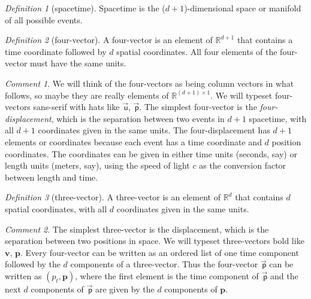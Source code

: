 \documentclass[10pt]{article}
\newcounter{par}
\theoremstyle{remark}
\newtheorem{definition}{Definition}
\theoremstyle{remark}
\newtheorem*{remark}{Comment}
\newcommand\upvec[1]{\!\vec{\,\mathrm{#1}}}
\newcommand{\tv}[1]{{\mathbf{#1}}} %
\newcommand{\fv}[1]{\upvec{\mathsf{#1}}} %
\begin{document}
\begin{definition}[spacetime]
    Spacetime is the ($d+1$)-dimensional space or manifold of all possible events.
\end{definition}

\begin{definition}[four-vector]\label{def:fv}
    A four-vector is an element of $\mathbb{R}^{d+1}$ that contains a time coordinate followed by $d$ spatial coordinates.
    All four elements of the four-vector must have the same units.
\end{definition}
\begin{remark}
    We will think of the four-vectors as being column vectors in what follows, so maybe they are really elements of $\mathbb{R}^{(d+1)\times 1}$.
    We will typeset four-vectors sans-serif with hats like $\fv{u}$, $\fv{p}$.
    The simplest four-vector is the \emph{four-displacement}, which is the separation between two events in $d+1$ spacetime, with all $d+1$ coordinates given in the same units.
    The four-displacement has $d+1$ elements or coordinates because each event has a time coordinate and $d$ position coordinates.
    The coordinates can be given in either time units (seconds, say) or length units (meters, say), using the speed of light $c$ as the conversion factor between length and time.
\end{remark}

\begin{definition}[three-vector]
    A three-vector is an element of $\mathbb{R}^{d}$ that contains $d$ spatial coordinates, with all $d$ coordinates given in the same units.
\end{definition}
\begin{remark}
    The simplest three-vector is the displacement, which is the separation between two positions in space.
    We will typeset three-vectors bold like $\tv{v}$, $\tv{p}$.
    Every four-vector can be written as an ordered list of one time component followed by the $d$ components of a three-vector.
    Thus the four-vector $\fv{p}$ can be written as $(p_t, \tv{p})$, where the first element is the time component of $\fv{p}$ and the next $d$ components of $\fv{p}$ are given by the $d$ components of $\tv{p}$.
\end{remark}
\end{document}
